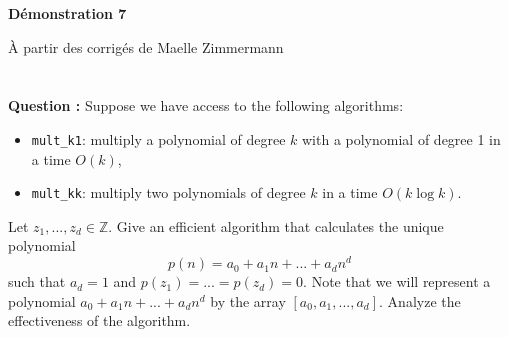 \documentclass[11pt]{article} %
\newenvironment{question}[1][\unskip]{%
	\par
	\noindent
	\textbf{Question #1:}
	\noindent}
{\medskip}
\begin{document}

	\noindent \hrulefill
	\centerline{\bfseries Démonstration 7}
	\centerline{À partir des corrigés de Maelle Zimmermann}
	\noindent \hrulefill

	\vspace{1cm}
		\section{}
	\begin{question}
		Suppose we have access to the following algorithms:
		\begin{itemize}
			\item {\verb|mult_k1|: multiply a polynomial of degree $ k $ with a polynomial of degree 1 in a time $ O (k) $,}
			\item{\verb|mult_kk|: multiply two polynomials of degree $ k $ in a time $ O (k \log k) $.}
		\end{itemize}
		Let $ z_1, ..., z_d \in \mathbb {Z} $. Give an efficient algorithm that calculates the unique polynomial $$ p (n) = a_0 + a_1 n + ... + a_d n ^ d $$ such that $ a_d = 1 $ and $ p (z_1) = ... = p (z_d) = 0. $ Note that we will represent a polynomial $ a_0 + a_1 n + ... + a_d n ^ d $ by the array $ [a_0, a_1, ..., a_d] $. Analyze the effectiveness of the algorithm.
	\end{question}
\end{document}
